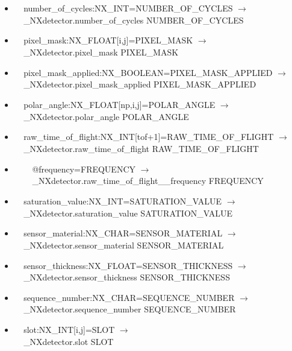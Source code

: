 \documentclass[11pt]{article}
\begin{document}
{{\begin{itemize}
\item{\verb|  |number\_of\_cycles:NX\_INT=NUMBER\_OF\_CYCLES $\rightarrow$\\
\verb|  |\_NXdetector.number\_of\_cycles NUMBER\_OF\_CYCLES}

\item{\verb|  |pixel\_mask:NX\_FLOAT[i,j]=PIXEL\_MASK $\rightarrow$\\
\verb|  |\_NXdetector.pixel\_mask PIXEL\_MASK}

\item{\verb|  |pixel\_mask\_applied:NX\_BOOLEAN=PIXEL\_MASK\_APPLIED $\rightarrow$\\
\verb|  |\_NXdetector.pixel\_mask\_applied PIXEL\_MASK\_APPLIED}

\item{\verb|  |polar\_angle:NX\_FLOAT[np,i,j]=POLAR\_ANGLE $\rightarrow$\\
\verb|  |\_NXdetector.polar\_angle POLAR\_ANGLE}

\item{\verb|  |raw\_time\_of\_flight:NX\_INT[tof+1]=RAW\_TIME\_OF\_FLIGHT $\rightarrow$\\
\verb|  |\_NXdetector.raw\_time\_of\_flight RAW\_TIME\_OF\_FLIGHT}

\item{\verb|    |@frequency=FREQUENCY $\rightarrow$\\
\verb|    |\_NXdetector.raw\_time\_of\_flight\_\_frequency FREQUENCY}

\item{\verb|  |saturation\_value:NX\_INT=SATURATION\_VALUE $\rightarrow$\\
\verb|  |\_NXdetector.saturation\_value SATURATION\_VALUE}

\item{\verb|  |sensor\_material:NX\_CHAR=SENSOR\_MATERIAL $\rightarrow$\\
\verb|  |\_NXdetector.sensor\_material SENSOR\_MATERIAL}

\item{\verb|  |sensor\_thickness:NX\_FLOAT=SENSOR\_THICKNESS $\rightarrow$\\
\verb|  |\_NXdetector.sensor\_thickness SENSOR\_THICKNESS}

\item{\verb|  |sequence\_number:NX\_CHAR=SEQUENCE\_NUMBER $\rightarrow$\\
\verb|  |\_NXdetector.sequence\_number SEQUENCE\_NUMBER}

\item{\verb|  |slot:NX\_INT[i,j]=SLOT $\rightarrow$\\
\verb|  |\_NXdetector.slot SLOT}


\end{itemize}}}
\end{document}
